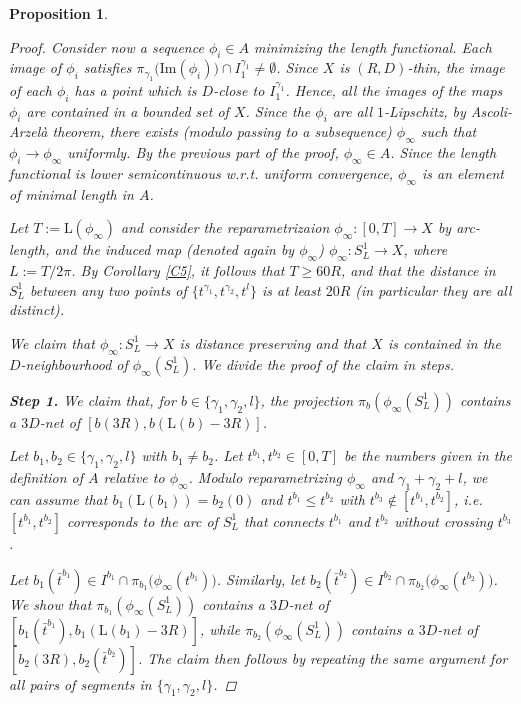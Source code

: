 \documentclass[10pt]{article}
\newtheorem{proposition}[thm]{Proposition}
\theoremstyle{definition}
\newcommand{\length}{\mathrm{L}}
\begin{document}
\begin{proposition}
\begin{proof}
         Consider now a sequence $\phi_i \in A$ minimizing the length functional. Each image of $\phi_i$ satisfies $\pi_{\gamma_1}\big( \mathrm{Im}(\phi_i)\big) \cap I_1^{\gamma_1} \neq \emptyset$. Since $X$ is $(R,D)$-thin, the image of each $\phi_i$ has a point which is $D$-close to $I_1^{\gamma_1}$. Hence, all the images of the maps $\phi_i$ are contained in a bounded set of $X$. Since the $\phi_i$ are all $1$-Lipschitz, by Ascoli-Arzelà theorem, there exists (modulo passing to a subsequence) $\phi_\infty$ such that $\phi_i \to \phi_\infty$ uniformly. By the previous part of the proof, $\phi_\infty \in A$. Since the length functional is lower semicontinuous w.r.t. uniform convergence, $\phi_\infty$ is an element of minimal length in $A$. 
         
         Let $T:=\length(\phi_\infty)$ and consider the reparametrizaion $\phi_\infty:[0,T] \to X$ by arc-length, and the induced map (denoted again by $\phi_\infty$) $\phi_\infty:S^1_L \to X$, where $L:=T/2\pi$. By Corollary \ref{C5}, it follows that $T \geq 60R$, and that the distance in $S^1_L$ between any two points of $\{t^{\gamma_1},t^{\gamma_2},t^l\}$ is at least $20R$ (in particular they are all distinct).

         
         
         
         We claim that $\phi_\infty:S^1_L \to X$ is distance preserving and that $X$ is contained in the $D$-neighbourhood of $\phi_\infty(S^1_L)$. We divide the proof of the claim in steps.
         
        \textbf{Step 1.} We claim that, for $b \in \{\gamma_1,\gamma_2,l\}$, the projection $\pi_b(\phi_\infty(S^1_L))$ contains a $3D$-net of $[b(3R),b(\length(b)-3R)]$.

        Let $b_1,b_2 \in \{\gamma_1,\gamma_2,l\}$ with $b_1 \neq b_2$. 
        Let $t^{b_1},t^{b_2} \in [0,T]$ be the numbers given in the definition of $A$ relative to $\phi_\infty$. Modulo reparametrizing $\phi_\infty$ and $\gamma_1+\gamma_2+l$, we can assume that $b_1(\length(b_1))=b_2(0)$ and $t^{b_1} \leq t^{b_2}$ with $t^{b_3} \notin [t^{b_1},t^{b_2}]$, i.e. $[t^{b_1},t^{b_2}]$ corresponds to the arc of $S^1_L$ that connects $t^{b_1}$ and $t^{b_2}$ without crossing $t^{b_3}$.
        
        Let $b_1(\bar{t}^{b_1}) \in I^{b_1} \cap \pi_{b_1}\big(\phi_\infty(t^{b_1})\big)$.
        Similarly, let $b_2(\bar{t}^{b_2}) \in I^{b_2} \cap \pi_{b_2}\big(\phi_\infty(t^{b_2})\big)$.
        We show that $\pi_{b_1}(\phi_\infty(S^1_L))$ contains a $3D$-net of $[b_1(\bar{t}^{b_1}),b_1(\length(b_1)-3R)]$, while $\pi_{b_2}(\phi_\infty(S^1_L))$ contains a $3D$-net of $[b_2(3R),b_2(\bar{t}^{b_2})]$. The claim then follows by repeating the same argument for all pairs of segments in $\{\gamma_1,\gamma_2,l\}$.
        

\end{proof}
\end{proposition}
\end{document}
